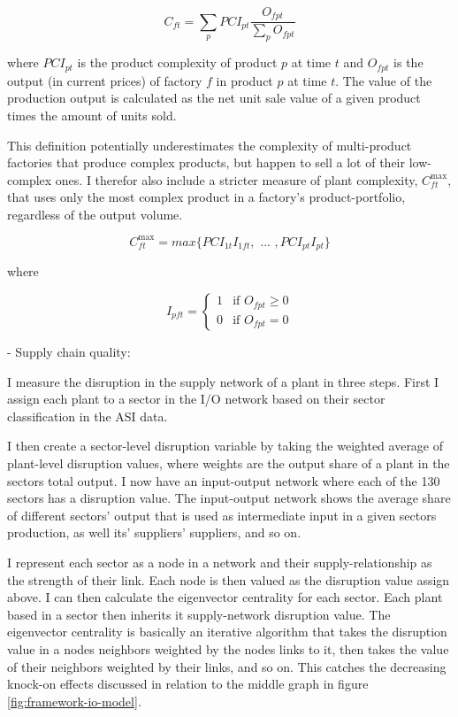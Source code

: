 \documentclass[11pt]{article}
\begin{document}
$$
C_{ft} = \sum_p PCI_{pt} \frac{O_{fpt}}{\sum_p O_{fpt}}
$$

where \(PCI_{pt}\) is the product complexity of product \(p\) at time \(t\) and \(O_{fpt}\) is the output (in current prices) of factory \(f\) in product \(p\) at time \(t\). The value of the production output is calculated as the net unit sale value of a given product times the amount of units sold. 

This definition potentially underestimates the complexity of multi-product factories that produce complex products, but happen to sell a lot of their low-complex ones. I therefor also include a stricter measure of plant complexity, \(C^{\text{max}}_{ft}\), that uses only the most complex product in a factory's product-portfolio, regardless of the output volume.

$$
C^{\text{max}}_{ft} = max \{ PCI_{1t} I_{1ft}, \text{ ... }, PCI_{pt} I_{pt} \}
$$

where

\[
I_{pft} = \begin{cases}
 1 & \text{if } O_{fpt} \geq 0 \\
 0 & \text{if } O_{fpt} = 0
\end{cases}
\]

- Supply chain quality:

I measure the disruption in the supply network of a plant in three steps. First I assign each plant to a sector in the I/O network based on their sector classification in the ASI data.

I then create a sector-level disruption variable by taking the weighted average of plant-level disruption values, where weights are the output share of a plant in the sectors total output. I now have an input-output network where each of the 130 sectors has a disruption value. The input-output network shows the average share of different sectors' output that is used as intermediate input in a given sectors production, as well its' suppliers' suppliers, and so on.

I represent each sector as a node in a network and their supply-relationship as the strength of their link. Each node is then valued as the disruption value assign above. I can then calculate the eigenvector centrality for each sector. Each plant based in a sector then inherits it supply-network disruption value. The eigenvector centrality is basically an iterative algorithm that takes the disruption value in a nodes neighbors weighted by the nodes links to it, then takes the value of their neighbors weighted by their links, and so on. This catches the decreasing knock-on effects discussed in relation to the middle graph in figure \ref{fig:framework-io-model}.
\end{document}
